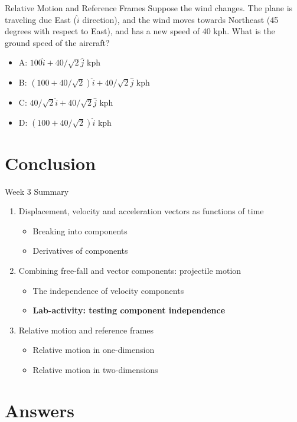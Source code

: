 \documentclass{beamer}
\begin{document}
\begin{frame}{Relative Motion and Reference Frames}
\small
Suppose the wind changes.  The plane is traveling due East ($\hat{i}$ direction), and the wind moves towards Northeast (45 degrees with respect to East), and has a new speed of 40 kph.  What is the ground speed of the aircraft?
\begin{itemize}
\item A: $100\hat{i} + 40/\sqrt{2}\hat{j}$  kph
\item B: $(100+40/\sqrt{2})\hat{i} + 40/\sqrt{2}\hat{j}$  kph
\item C: $40/\sqrt{2}\hat{i} + 40/\sqrt{2}\hat{j}$  kph
\item D: $(100+40/\sqrt{2})\hat{i}$  kph
\end{itemize}
\end{frame}

\section{Conclusion}

\begin{frame}{Week 3 Summary}
\begin{enumerate}
\item Displacement, velocity and acceleration vectors \alert{as functions of time}
\begin{itemize}
\item Breaking into components
\item Derivatives of components
\end{itemize}
\item Combining free-fall and vector components: \alert{projectile motion}
\begin{itemize}
\item The independence of velocity components
\item \textbf{Lab-activity: testing component independence}
\end{itemize}
\item Relative motion and reference frames
\begin{itemize}
\item Relative motion in one-dimension
\item Relative motion in two-dimensions
\end{itemize}
\end{enumerate}
\end{frame}

\section{Answers}
\end{document}
